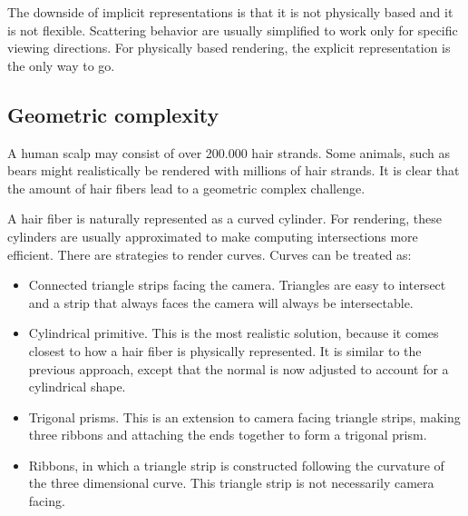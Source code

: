\documentclass[11pt,a4paper]{report}
\begin{document}







The downside of implicit representations is that it is not physically based and it is not flexible. Scattering behavior are usually simplified to work only for specific viewing directions. For physically based rendering, the explicit representation is the only way to go.

\subsection{Geometric complexity}

A human scalp may consist of over 200.000 hair strands. Some animals, such as bears might realistically be rendered with millions of hair strands. It is clear that the amount of hair fibers lead to a geometric complex challenge. 

A hair fiber is naturally represented as a curved cylinder. For rendering, these cylinders are usually approximated to make computing intersections more efficient. There are strategies to render curves. Curves can be treated as:

\begin{itemize}
\item Connected triangle strips facing the camera. Triangles are easy to intersect and a strip that always faces the camera will always be intersectable.

\item Cylindrical primitive. This is the most realistic solution, because it comes closest to how a hair fiber is physically represented. It is similar to the previous approach, except that the normal is now adjusted to account for a cylindrical shape.

\item Trigonal prisms. This is an extension to camera facing triangle strips, making three ribbons and attaching the ends together to form a trigonal prism.

\item Ribbons, in which a triangle strip is constructed following the curvature of the three dimensional curve. This triangle strip is not necessarily camera facing.

\end{itemize}
\end{document}
